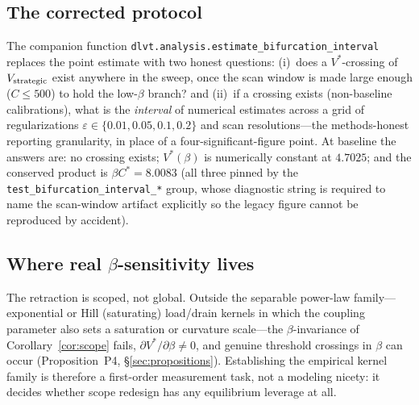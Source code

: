 \subsection{The corrected protocol}

The companion function
\texttt{dlvt.analysis.estimate\_bifurcation\_interval} replaces the point
estimate with two honest questions: (i)~does a $V^{*}$-crossing of
$V_{\mathrm{strategic}}$ exist anywhere in the sweep, once the scan window is made large
enough ($C\le500$) to hold the low-$\beta$ branch? and (ii)~if a crossing
exists (non-baseline calibrations), what is the \emph{interval} of
numerical estimates across a grid of regularizations
$\varepsilon\in\{0.01,0.05,0.1,0.2\}$ and scan resolutions---the
methods-honest reporting granularity, in place of a four-significant-figure
point. At baseline the answers are: no crossing exists;
$V^{*}(\beta)$ is numerically constant at $4.7025$; and the conserved
product is $\beta C^{*}=8.0083$ (all three pinned by the
\texttt{test\_bifurcation\_interval\_*} group, whose diagnostic string is
required to name the scan-window artifact explicitly so the legacy figure
cannot be reproduced by accident).

\subsection{Where real $\beta$-sensitivity lives}

The retraction is scoped, not global. Outside the separable power-law
family---exponential or Hill (saturating) load/drain kernels in which the
coupling parameter also sets a saturation or curvature scale---the
$\beta$-invariance of Corollary~\ref{cor:scope} fails,
$\partial V^{*}/\partial\beta\neq0$, and genuine threshold crossings in
$\beta$ can occur (Proposition~P4, \S\ref{sec:propositions}). Establishing
the empirical kernel family is therefore a first-order measurement task,
not a modeling nicety: it decides whether scope redesign has any
equilibrium leverage at all.
